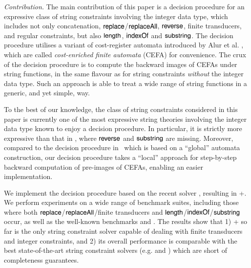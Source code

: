 

\noindent\emph{Contribution.} The main contribution of this paper is a decision procedure for an expressive class of string constraints involving the integer data type, which includes not only concatenation, $\mathsf{replace}$/$\mathsf{replaceAll}$, $\mathsf{reverse}$, finite transducers, and regular constraints, but also $\mathsf{length}$, $\mathsf{indexOf}$ and $\mathsf{substring}$. The decision procedure utilises a variant of cost-register automata introduced by Alur et al. \cite{RLJ+13}, which are called \emph{cost-enriched finite automata} (CEFA) for convenience. The crux of the decision procedure is to compute the backward images of CEFAs under string functions,  in the same flavour as \cite{CHL+19} for string constraints \emph{without} the integer data type. Such an approach %
is able to treat %
a wide range of string functions in a generic, and yet simple, way. 

To the best of our knowledge, the class of string constraints considered in this paper is currently one of the most expressive string theories involving the integer data type known to enjoy a decision procedure. In particular, it is strictly more expressive than that in \cite{LB16}, where $\mathsf{reverse}$ and $\mathsf{substring}$ are missing. 
Moreover, compared to the decision procedure in~\cite{LB16} which is based on a ``global'' automata construction, our decision procedure takes a ``local'' approach for step-by-step backward computation of pre-images of CEFAs, enabling an easier implementation. 


%
We implement the decision procedure based on %
the recent {\ostrich} solver \cite{CHL+19},  resulting in {\ostrich}+.  We perform experiments on a wide range of benchmark suites, including those where both $\mathsf{replace}$/$\mathsf{replaceAll}$/finite transducers and $\mathsf{length}$/$\mathsf{indexOf}$/$\mathsf{substring}$ occur, as well as the well-known benchmarks {\kaluzabench} and {\pyexbench}.
The results show that  %
1) {\ostrich}+ so far is the only string constraint solver capable of dealing with finite transducers and integer constraints, and 2) its overall performance is comparable with the best state-of-the-art string constraint solvers (e.g. {\cvc} and {\zthreetrau}) which are short of completeness guarantees. 

